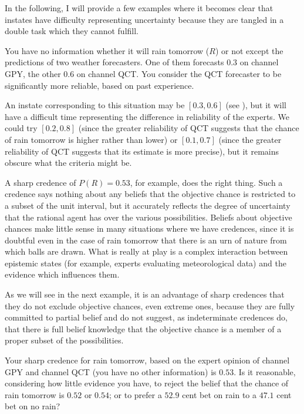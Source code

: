 \documentclass[11pt]{article}
\begin{document}
In the following, I will provide a few examples where it becomes clear
that instates have difficulty representing uncertainty because they
are tangled in a double task which they cannot fulfill.

\begin{quotex}
  \label{ex:aggreg} You have no
  information whether it will rain tomorrow ($R$) or not except the
  predictions of two weather forecasters. One of them forecasts 0.3 on
  channel GPY, the other 0.6 on channel QCT. You consider the QCT
  forecaster to be significantly more reliable, based on past
  experience.
\end{quotex}

An instate corresponding to this situation may be $[0.3,0.6]$ (see
), but it will have a difficult time
representing the difference in reliability of the experts. We could
try $[0.2,0.8]$ (since the greater reliability of QCT suggests that
the chance of rain tomorrow is higher rather than lower) or
$[0.1,0.7]$ (since the greater reliability of QCT suggests that its
estimate is more precise), but it remains obscure what the criteria
might be.

A sharp credence of $P(R)=0.53$, for example, does the right thing.
Such a credence says nothing about any beliefs that the objective
chance is restricted to a subset of the unit interval, but it
accurately reflects the degree of uncertainty that the rational agent
has over the various possibilities. Beliefs about objective chances
make little sense in many situations where we have credences, since it
is doubtful even in the case of rain tomorrow that there is an urn of
nature from which balls are drawn. What is really at play is a complex
interaction between epistemic states (for example, experts evaluating
meteorological data) and the evidence which influences them.

As we will see in the next example, it is an advantage of sharp
credences that they do not exclude objective chances, even extreme
ones, because they are fully committed to partial belief and do not
suggest, as indeterminate credences do, that there is full belief
knowledge that the objective chance is a member of a proper subset of
the possibilities.

\begin{quotex}
  \label{ex:preccre} Your sharp credence
  for rain tomorrow, based on the expert opinion of channel GPY and
  channel QCT (you have no other information) is $0.53$. Is it
  reasonable, considering how little evidence you have, to reject the
  belief that the chance of rain tomorrow is $0.52$ or $0.54$; or to
  prefer a $52.9$ cent bet on rain to a $47.1$ cent bet on no rain?
\end{quotex}
\end{document}
